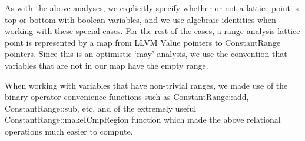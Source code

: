 \documentclass{article}
\theoremstyle{definition}
\begin{document}
As with the above analyses, we explicitly specify whether or not a lattice point is top or bottom with boolean variables, and we use algebraic identities when working with these special cases. For the rest of the cases, a range analysis lattice point is represented by a map from LLVM Value pointers to ConstantRange pointers. Since this is an optimistic `may' analysis, we use the convention that variables that are {not} in our map have the empty range.

When working with variables that have non-trivial ranges, we made use of the binary operator convenience functions such as ConstantRange::add, ConstantRange::sub, etc. and of the extremely useful ConstantRange::makeICmpRegion function which made the above relational operations much easier to compute.
\end{document}
